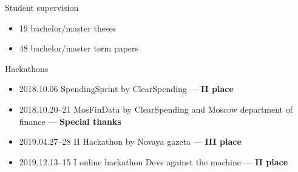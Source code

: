 \documentclass{resume} %
\begin{document}
\begin{rSection}{Student supervision}
\begin{itemize}
\item 19 bachelor/master theses
\item 48 bachelor/master term papers
\end{itemize}

\end{rSection}


\begin{rSection}{Hackathons}
\begin{itemize}
\item 2018.10.06  SpendingSprint by ClearSpending  --- \textbf{II place}
\item 2018.10.20--21  MosFinData by ClearSpending and Moscow department of finance
 --- \textbf{Special thanks}
\item  2019.04.27--28 II Hackathon by Novaya gazeta --- \textbf{III place}
\item 2019.12.13--15 I online hackathon Devs against the machine --- \textbf{II place}
\end{itemize}

\end{rSection}
\end{document}
